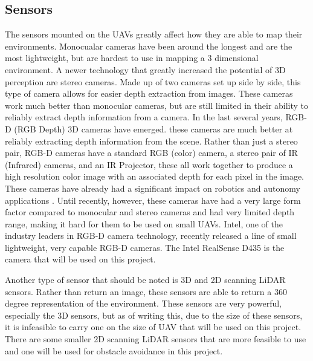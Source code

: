 \documentclass[12pt, letterpaper]{article}
\begin{document}
\subsection{Sensors} 
The sensors mounted on the UAVs greatly affect how they are able to map their environments. Monocualar cameras have been around the longest and are the most lightweight, but are hardest to use in mapping a 3 dimensional environment. A newer technology that greatly increased the potential of 3D perception are stereo cameras. Made up of two cameras set up side by side, this type of camera allows for easier depth extraction from images. These cameras work much better than monocular cameras, but are still limited in their ability to reliably extract depth information from a camera. In the last several years, RGB-D (RGB Depth) 3D cameras have emerged. these cameras are much better at reliably extracting depth information from the scene. Rather than just a stereo pair, RGB-D cameras have a standard RGB (color) camera, a stereo pair of IR (Infrared) cameras, and an IR Projector, these all work together to produce a high resolution color image with an associated depth for each pixel in the image. These cameras have already had a significant impact on robotics and autonomy applications \cite{Henry2010}. Until recently, however, these cameras have had a very large form factor compared to monocular and stereo cameras and had very limited depth range, making it hard for them to be used on small UAVs. Intel, one of the industry leaders in RGB-D camera technology, recently released a line of small lightweight, very capable RGB-D cameras. The Intel RealSense D435 is the camera that will be used on this project.

Another type of sensor that should be noted is 3D and 2D scanning LiDAR sensors. Rather than return an image, these sensors are able to return a 360 degree representation of the environment. These sensors are very powerful, especially the 3D sensors, but as of writing this, due to the size of these sensors, it is infeasible to carry one on the size of UAV that will be used on this project. There are some smaller 2D scanning LiDAR sensors that are more feasible to use and one will be used for obstacle avoidance in this project.
 
\end{document}
